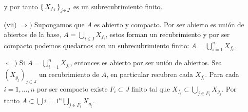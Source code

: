 \documentclass[../main.tex]{subfiles}
\begin{document}
y por tanto $\set{X_{f_j}}_{j\in J}$ es un subrecubrimiento finito.

(vii) $\Rightarrow)$ Supongamos que $A$ es abierto y compacto. Por ser abierto es unión de abiertos de la base, $A=\bigcup_{i\in I}X_{f_i}$, estos forman un recubrimiento y por ser compacto podemos quedarnos con un subrecubrimiento finito: $A=\bigcup_{i=1}^n X_{f_i}$.

$\Leftarrow)$ Si $A=\bigcup_{i=1}^n X_{f_i}$, entonces es abierto por ser unión de abiertos. Sea $(X_{g_j})_{j\in J}$ un recubrimiento de $A$, en particular recubren cada $X_{f_i}$. Para cada $i=1,\dots, n$ por ser compacto existe $F_i \subset J$ finito tal que $X_{f_i}\subset \bigcup_{j \in F_i} X_{g_j}$. Por tanto $A \subset \bigcup{i=1}^n \bigcup_{j \in F_i} X_{g_j}$.
\end{document}
